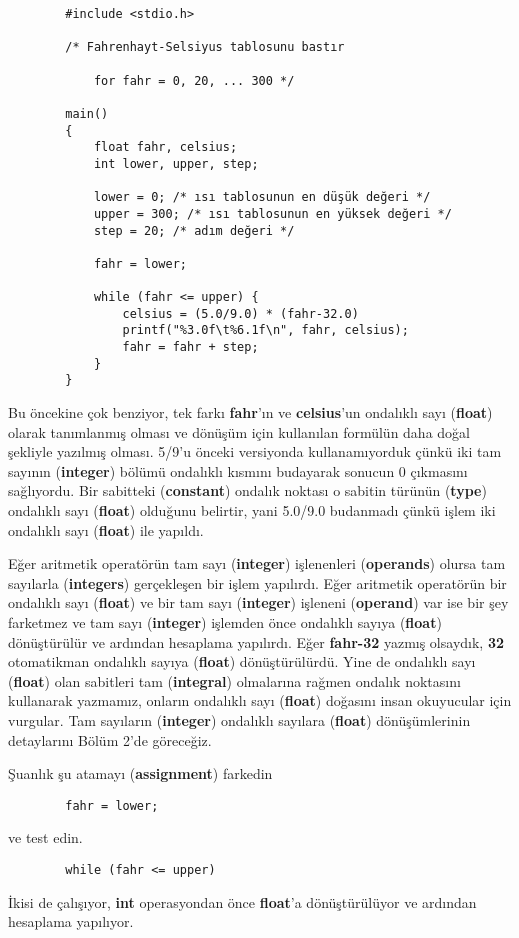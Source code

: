 \documentclass[a4paper,12pt,oneside]{book}
\begin{document}
\begin{lstlisting}
        #include <stdio.h>

        /* Fahrenhayt-Selsiyus tablosunu bastır

            for fahr = 0, 20, ... 300 */

        main()
        {
            float fahr, celsius;
            int lower, upper, step;

            lower = 0; /* ısı tablosunun en düşük değeri */
            upper = 300; /* ısı tablosunun en yüksek değeri */
            step = 20; /* adım değeri */

            fahr = lower;

            while (fahr <= upper) {
                celsius = (5.0/9.0) * (fahr-32.0)
                printf("%3.0f\t%6.1f\n", fahr, celsius);
                fahr = fahr + step;
            }
        }
\end{lstlisting}
\par Bu öncekine çok benziyor, tek farkı \textbf{fahr}'ın ve \textbf{celsius}'un ondalıklı sayı (\textbf{float}) olarak tanımlanmış olması ve dönüşüm için kullanılan formülün daha doğal şekliyle yazılmış olması. 5/9'u önceki versiyonda kullanamıyorduk çünkü iki tam sayının (\textbf{integer}) bölümü ondalıklı kısmını budayarak sonucun 0 çıkmasını sağlıyordu. Bir sabitteki (\textbf{constant}) ondalık noktası o sabitin türünün (\textbf{type}) ondalıklı sayı (\textbf{float}) olduğunu belirtir, yani 5.0/9.0 budanmadı çünkü işlem iki ondalıklı sayı (\textbf{float}) ile yapıldı.
\par Eğer aritmetik operatörün tam sayı (\textbf{integer}) işlenenleri (\textbf{operands}) olursa tam sayılarla (\textbf{integers}) gerçekleşen bir işlem yapılırdı. Eğer aritmetik operatörün bir ondalıklı sayı (\textbf{float}) ve bir tam sayı (\textbf{integer}) işleneni (\textbf{operand}) var ise bir şey farketmez ve tam sayı (\textbf{integer}) işlemden önce ondalıklı sayıya (\textbf{float}) dönüştürülür ve ardından hesaplama yapılırdı. Eğer \textbf{fahr-32} yazmış olsaydık, \textbf{32} otomatikman ondalıklı sayıya (\textbf{float}) dönüştürülürdü. Yine de ondalıklı sayı (\textbf{float}) olan sabitleri tam (\textbf{integral}) olmalarına rağmen ondalık noktasını kullanarak yazmamız, onların ondalıklı sayı (\textbf{float}) doğasını insan okuyucular için vurgular. Tam sayıların (\textbf{integer}) ondalıklı sayılara (\textbf{float}) dönüşümlerinin detaylarını Bölüm 2'de göreceğiz.


\pagebreak Şuanlık şu atamayı (\textbf{assignment}) farkedin
\begin{lstlisting}
        fahr = lower;
\end{lstlisting} ve test edin.
\begin{lstlisting}
        while (fahr <= upper)
\end{lstlisting} İkisi de çalışıyor, \textbf{int} operasyondan önce \textbf{float}'a dönüştürülüyor ve ardından hesaplama yapılıyor.
\end{document}
